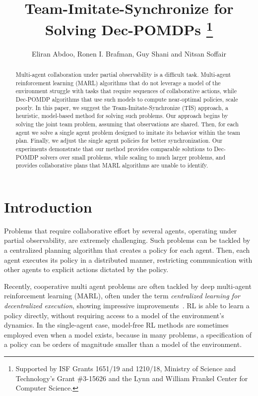 \documentclass[runningheads]{llncs}
\begin{document}
\title{Team-Imitate-Synchronize for Solving Dec-POMDPs
\thanks{Supported by ISF Grants 1651/19  and 1210/18,
Ministry of Science and Technology's Grant \#3-15626 and the Lynn and William Frankel Center for Computer Science.}
}
\author{Eliran Abdoo,  Ronen I. Brafman{\Letter}, Guy Shani and Nitsan Soffair}

\maketitle

\begin{abstract}
Multi-agent collaboration under partial observability is a difficult task. Multi-agent reinforcement learning (MARL) algorithms that do not leverage a model of the environment struggle with tasks that require sequences of collaborative actions,
while Dec-POMDP algorithms that use such models to compute near-optimal policies, scale poorly. 
In this paper, we suggest the Team-Imitate-Synchronize (TIS) approach,  a heuristic, model-based method for solving such problems. Our approach begins by solving the joint team problem, assuming that observations are shared. Then, for each agent we solve a single agent problem designed to imitate its behavior  within the team plan. Finally, we adjust the single agent policies for better synchronization.
Our experiments demonstrate that our method provides comparable solutions to Dec-POMDP solvers over small problems, while scaling to much larger problems, and provides collaborative plans that MARL algorithms are unable to identify.
\end{abstract}


\section{Introduction}

Problems that require collaborative effort by several agents, operating under partial observability, are  extremely challenging. Such problems can be tackled by a centralized planning algorithm that creates a policy for each agent. Then, each agent executes its policy in a distributed manner, restricting communication with other agents to explicit actions dictated by the policy.
 
Recently, cooperative multi agent problems are often tackled by deep multi-agent reinforcement learning (MARL), often under the term {\em centralized learning for decentralized execution}, showing impressive improvements~\cite{WQmix,Qtran}. 
RL is able to learn a policy directly, without requiring access to a model of the environment's dynamics. In the single-agent case, model-free RL methods are sometimes employed even when a model exists, because in many problems, a specification of a policy can be orders of magnitude smaller than a model of the environment. 
 
\end{document}
